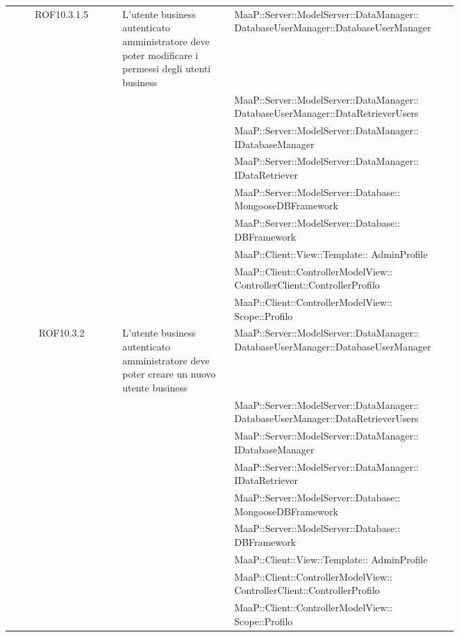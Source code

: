 \begin{center}
\begin{longtable}{|c|p{0.25\linewidth}|p{0.5\linewidth}|}
\midrule
ROF10.3.1.5
& L'utente business autenticato amministratore deve poter modificare i permessi degli utenti business
& MaaP::Server::ModelServer::DataManager:: DatabaseUserManager::DatabaseUserManager\\
& & MaaP::Server::ModelServer::DataManager:: DatabaseUserManager::DataRetrieverUsers\\
& & MaaP::Server::ModelServer::DataManager:: IDatabaseManager\\
& & MaaP::Server::ModelServer::DataManager:: IDataRetriever\\
& & MaaP::Server::ModelServer::Database:: MongooseDBFramework\\
& & MaaP::Server::ModelServer::Database:: DBFramework\\
& & MaaP::Client::View::Template:: AdminProfile\\
& & MaaP::Client::ControllerModelView:: ControllerClient::ControllerProfilo\\
& & MaaP::Client::ControllerModelView:: Scope::Profilo\\

\midrule
ROF10.3.2
& L'utente business autenticato amministratore deve poter creare un nuovo utente business
& MaaP::Server::ModelServer::DataManager:: DatabaseUserManager::DatabaseUserManager\\
& & MaaP::Server::ModelServer::DataManager:: DatabaseUserManager::DataRetrieverUsers\\
& & MaaP::Server::ModelServer::DataManager:: IDatabaseManager\\
& & MaaP::Server::ModelServer::DataManager:: IDataRetriever\\
& & MaaP::Server::ModelServer::Database:: MongooseDBFramework\\
& & MaaP::Server::ModelServer::Database:: DBFramework\\
& & MaaP::Client::View::Template:: AdminProfile\\
& & MaaP::Client::ControllerModelView:: ControllerClient::ControllerProfilo\\
& & MaaP::Client::ControllerModelView:: Scope::Profilo\\


\end{longtable}
\end{center}
